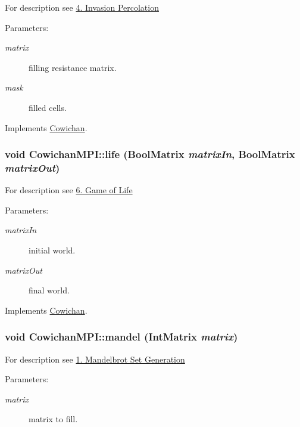 For description see \hyperlink{index_invperc_sec}{4. Invasion Percolation} \begin{Desc}
\item[Parameters:]
\begin{description}
\item[{\em matrix}]filling resistance matrix. \item[{\em mask}]filled cells. \end{description}
\end{Desc}


Implements \hyperlink{class_cowichan_ea126792a31e54a8722663b7ea768955}{Cowichan}.\hypertarget{class_cowichan_m_p_i_9c739951d036ef7905bda7cb896e0edf}{
\subsubsection[{life}]{\setlength{\rightskip}{0pt plus 5cm}void CowichanMPI::life ({\bf BoolMatrix} {\em matrixIn}, \/  {\bf BoolMatrix} {\em matrixOut})}}
\label{class_cowichan_m_p_i_9c739951d036ef7905bda7cb896e0edf}


For description see \hyperlink{index_life_sec}{6. Game of Life} \begin{Desc}
\item[Parameters:]
\begin{description}
\item[{\em matrixIn}]initial world. \item[{\em matrixOut}]final world. \end{description}
\end{Desc}


Implements \hyperlink{class_cowichan_d449595ef2fe934bdd128ac8b1f51d07}{Cowichan}.\hypertarget{class_cowichan_m_p_i_58274fc55ed8a352a8924b130f3b5d2e}{
\subsubsection[{mandel}]{\setlength{\rightskip}{0pt plus 5cm}void CowichanMPI::mandel ({\bf IntMatrix} {\em matrix})}}
\label{class_cowichan_m_p_i_58274fc55ed8a352a8924b130f3b5d2e}


For description see \hyperlink{index_mandel_sec}{1. Mandelbrot Set Generation} \begin{Desc}
\item[Parameters:]
\begin{description}
\item[{\em matrix}]matrix to fill. \end{description}
\end{Desc}


